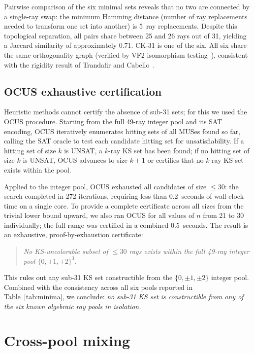 \documentclass[twocolumn,pra,superscriptaddress,nofootinbib]{revtex4-2}
\begin{document}
Pairwise comparison of the six minimal sets reveals that no two are connected by
a single-ray swap: the minimum Hamming distance (number of ray replacements
needed to transform one set into another) is 5~ray replacements. Despite this
topological separation, all pairs share between 25 and 26 rays out of 31,
yielding a Jaccard similarity of approximately 0.71. CK-31 is one of the six.
All six share the same orthogonality graph (verified by VF2 isomorphism
testing~\cite{Kernaghan2026algebraic}), consistent with the rigidity
result of Trandafir and Cabello~\cite{TrandafirCabello2025}.

\subsection{OCUS exhaustive certification}

Heuristic methods cannot certify the absence of sub-31 sets; for this we used
the OCUS procedure. Starting from the full 49-ray integer pool and its SAT
encoding, OCUS iteratively enumerates hitting sets of all MUSes found so far,
calling the SAT oracle to test each candidate hitting set for unsatisfiability.
If a hitting set of size $k$ is UNSAT, a $k$-ray KS set has been found; if
no hitting set of size $k$ is UNSAT, OCUS advances to size $k{+}1$ or certifies
that no $k$-ray KS set exists within the pool.

Applied to the integer pool, OCUS exhausted all candidates of size $\leq 30$:
the search completed in 272 iterations, requiring less than 0.2~seconds of
wall-clock time on a single core. To provide a complete certificate across all
sizes from the trivial lower bound upward, we also ran OCUS for all values of
$n$ from 21 to 30 individually; the full range was certified in a combined
0.5~seconds. The result is an exhaustive, proof-by-exhaustion certificate:

\begin{quote}
\textit{No KS-uncolorable subset of $\leq 30$ rays exists within the full
49-ray integer pool $\{0,\pm1,\pm2\}^3$.}
\end{quote}

This rules out any sub-31 KS set constructible from the $\{0,\pm1,\pm2\}$
integer pool. Combined with the consistency across all six pools reported in
Table~\ref{tab:minima}, we conclude: \textit{no sub-31 KS set is constructible
from any of the six known algebraic ray pools in isolation.}

\section{Cross-pool mixing}
\label{sec:cross}
\end{document}
